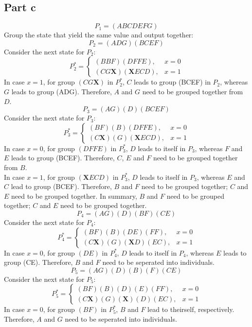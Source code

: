 \documentclass[12pt, a4paper]{article}
\begin{document}
	\subsection*{Part c}
	$$P_1 = (ABCDEFG)$$
	Group the state that yield the same value and output together:
	$$P_2 = (ADG)(BCEF)$$
	Consider the next state for $P_2$:
	\[
		P_2^* =
		\left.
		\begin{cases}
			(BBF)(DFFE), & x = 0 \\
			(CG\textbf{X})(\textbf{X}ECD), & x = 1
		\end{cases}
		\right.
	\]
	In case $x = 1$, for group $(CG\textbf{X})$ in $P_2^*$, $C$ leads to group (BCEF) in $P_2$, whereas $G$ leads to group (ADG). Therefore, $A$ and $G$ need to be grouped together from $D$.
	$$P_3 = (AG)(D)(BCEF)$$
	Consider the next state for $P_3$:
	\[
		P_3^* =
		\left.
		\begin{cases}
			(BF)(B)(DFFE), & x = 0 \\
			(C\textbf{X})(G)(\textbf{X}ECD), & x = 1
		\end{cases}
		\right.
	\]
	In case $x = 0$, for group $(DFFE)$ in $P_3^*$, $D$ leads to itself in $P_3$, whereas $F$ and $E$ leads to group (BCEF). Therefore, $C$, $E$ and $F$ need to be grouped together from $B$.\\
	In case $x = 1$, for group $(\textbf{X}ECD)$ in $P_3^*$, $D$ leads to itself in $P_3$, whereas $E$ and $C$ lead to group (BCEF). Therefore, $B$ and $F$ need to be grouped together; $C$ and $E$ need to be grouped together.
	In summary, $B$ and $F$ need to be grouped together; $C$ and $E$ need to be grouped together.
	$$P_4 = (AG)(D)(BF)(CE)$$
	Consider the next state for $P_4$:
	\[
		P_4^* =
		\left.
		\begin{cases}
			(BF)(B)(DE)(FF), & x = 0 \\
			(C\textbf{X})(G)(\textbf{X}D)(EC), & x = 1
		\end{cases}
		\right.
	\]
	In case $x = 0$, for group $(DE)$ in $P_4^*$, $D$ leads to itself in $P_4$, whereas  $E$ leads to group (CE). Therefore, $B$ and $F$ need to be seperated into individuals.
	$$P_5 = (AG)(D)(B)(F)(CE)$$
	Consider the next state for $P_5$:
	\[
		P_5^* =
		\left.
		\begin{cases}
			(BF)(B)(D)(E)(FF), & x = 0 \\
			(C\textbf{X})(G)(\textbf{X})(D)(EC), & x = 1
		\end{cases}
		\right.
	\]
	In case $x = 0$, for group $(BF)$ in $P_5^*$, $B$ and $F$ lead to theirself, respectively. Therefore, $A$ and $G$ need to be seperated into individuals.
\end{document}
